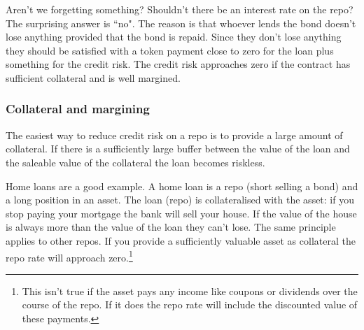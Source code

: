  


Aren't we forgetting something? Shouldn't there be an interest rate on the repo? The surprising answer is ``no".  The reason is that whoever lends the bond doesn't lose anything provided that the bond is repaid. Since they don't lose anything they should be satisfied with a token payment close to zero for the loan plus something for the credit risk. The credit risk approaches zero if the contract has sufficient collateral and is well margined.

\subsubsection{Collateral and margining} 

The easiest way to reduce credit risk on a repo is to provide a large amount of collateral. If there is a sufficiently large buffer between the value of the loan and the saleable value of the collateral the loan becomes riskless.

Home loans are a good example. A home loan is a repo (short selling a bond) and a long position in an asset. The loan (repo) is collateralised with the asset: if you stop paying your mortgage the bank will sell your house. If the value of the house is always more than the value of the loan they can't lose. The same principle applies to other repos. If you provide a sufficiently valuable asset as collateral the repo rate will approach zero.\footnote{This isn't true if the asset pays any income like coupons or dividends over the course of the repo. If it does the repo rate will include the discounted value of these payments.}

